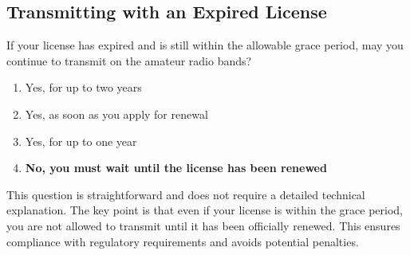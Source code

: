 \subsection{Transmitting with an Expired License}
\label{T1C11}

\begin{tcolorbox}[colback=gray!10!white,colframe=black!75!black,title=T1C11]
If your license has expired and is still within the allowable grace period, may you continue to transmit on the amateur radio bands?
\begin{enumerate}[label=\Alph*,noitemsep]
    \item Yes, for up to two years
    \item Yes, as soon as you apply for renewal
    \item Yes, for up to one year
    \item \textbf{No, you must wait until the license has been renewed}
\end{enumerate}
\end{tcolorbox}

This question is straightforward and does not require a detailed technical explanation. The key point is that even if your license is within the grace period, you are not allowed to transmit until it has been officially renewed. This ensures compliance with regulatory requirements and avoids potential penalties.